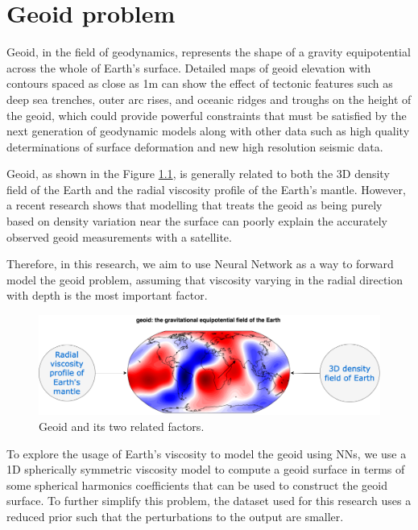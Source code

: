 \chapter{Geoid problem}\label{chap:content}

Geoid, in the field of geodynamics, represents the shape of a gravity equipotential across the whole of Earth's surface. Detailed maps of geoid elevation with contours spaced as close as 1m can show the effect of tectonic features such as deep sea trenches, outer arc rises, and oceanic ridges and troughs on the height of the geoid, which could provide powerful constraints that must be satisfied by the next generation of geodynamic models along with other data such as high quality determinations of surface deformation and new high resolution seismic data. \citep{10.1038_299104a0}

Geoid, as shown in the Figure \ref{figure:geoid_factors}, is generally related to both the 3D density field of the Earth and the radial viscosity profile of the Earth's mantle. However, a recent research shows that modelling that treats the geoid as being purely based on density variation near the surface can poorly explain the accurately observed geoid measurements with a satellite. \cite{10.1098_rsta.1989.0038}

Therefore, in this research, we aim to use Neural Network as a way to forward model the geoid problem,
assuming that viscosity varying in the radial direction with depth is the most important factor.

\begin{figure}[H]
    \centering
    \includegraphics[scale=0.4]{figures/geoid_images/Geoid.png}
    \caption{Geoid and its two related factors.}
    \label{figure:geoid_factors}
\end{figure}

To explore the usage of Earth’s viscosity to model the geoid using NNs, we use a 1D spherically symmetric viscosity model to compute a geoid surface in terms of some spherical harmonics coefficients that can be used to construct the geoid surface. To further simplify this problem, the dataset used for this research uses a reduced prior such that the perturbations to the output are smaller.


